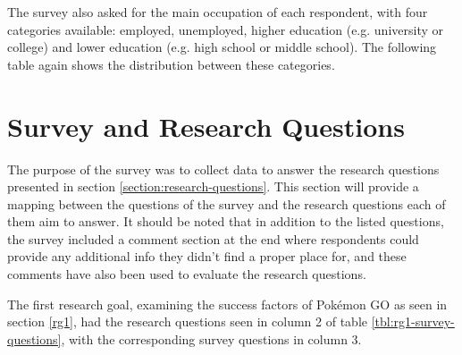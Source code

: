 
The survey also asked for the main occupation of each respondent, with four categories available: employed, unemployed, higher education (e.g. university or college) and lower education (e.g. high school or middle school). The following table again shows the distribution between these categories. 


\section{Survey and Research Questions}

The purpose of the survey was to collect data to answer the research questions presented in section \ref{section:research-questions}. This section will provide a mapping between the questions of the survey and the research questions each of them aim to answer. It should be noted that in addition to the listed questions, the survey included a comment section at the end where respondents could provide any additional info they didn't find a proper place for, and these comments have also been used to evaluate the research questions.


The first research goal, examining the success factors of Pokémon GO as seen in section \ref{rg1}, had the research questions seen in column 2 of table \ref{tbl:rg1-survey-questions}, with the corresponding survey questions in column 3.

